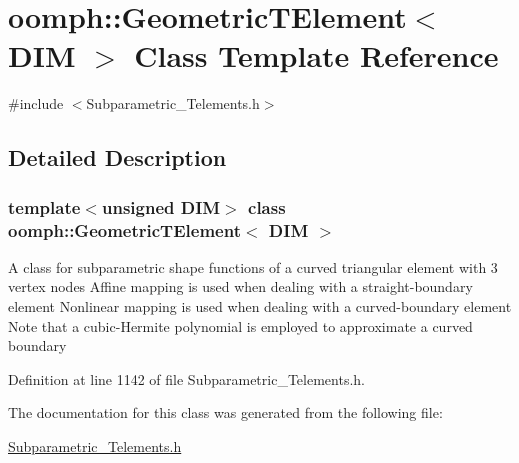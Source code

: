 \hypertarget{classoomph_1_1GeometricTElement}{}\section{oomph\+:\+:Geometric\+T\+Element$<$ D\+IM $>$ Class Template Reference}
\label{classoomph_1_1GeometricTElement}


{\ttfamily \#include $<$Subparametric\+\_\+\+Telements.\+h$>$}



\subsection{Detailed Description}
\subsubsection*{template$<$unsigned D\+IM$>$\newline
class oomph\+::\+Geometric\+T\+Element$<$ D\+I\+M $>$}

A class for subparametric shape functions of a curved triangular element with 3 vertex nodes Affine mapping is used when dealing with a straight-\/boundary element Nonlinear mapping is used when dealing with a curved-\/boundary element Note that a cubic-\/\+Hermite polynomial is employed to approximate a curved boundary 

Definition at line 1142 of file Subparametric\+\_\+\+Telements.\+h.



The documentation for this class was generated from the following file\+:\begin{DoxyCompactItemize}
\item 
\hyperlink{Subparametric__Telements_8h}{Subparametric\+\_\+\+Telements.\+h}\end{DoxyCompactItemize}
